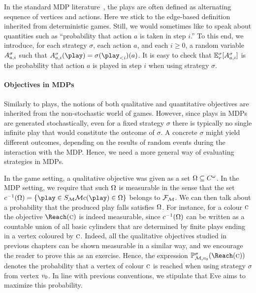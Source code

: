 
In the standard MDP literature~\cite{Puterman:2005}, the plays are often defined as alternating sequence of vertices and actions. Here we stick to the edge-based definition inherited from deterministic games. Still, we would sometimes like to speak about quantities such as ``probability that action $a$ is taken in step $i$.'' To this end, we introduce, for each strategy $\sigma$, each action $a$,  and each $i\geq 0$,  a random variable $A^{\sigma}_{a,i}$ such that $\actevent{\sigma}{a}{i}(\play)=\sigma(\play_{< i})(a)$. It is easy to check that  $\mathbb{E}^\sigma_v[A^{\sigma}_{a,i}]$ is the probability that action $a$ is played in step $i$ when using strategy $\sigma$.

\paragraph{Objectives in MDPs}

Similarly to plays, the notions of both qualitative and quantitative objectives 
are inherited from the non-stochastic world of games. However, since plays in 
MDPs are generated stochastically, even for a fixed strategy $\sigma$ there is 
typically no single infinite play that would constitute the outcome of 
$\sigma$. A concrete $\sigma$ might yield different outcomes, depending on the 
results of random events during the interaction with the MDP. Hence, we need a 
more general way of evaluating strategies in MDPs. 

In the game setting, a qualitative objective was given as a set $\Omega
\subseteq C^{\omega}$. In the MDP setting, we require that such 
$\Omega$ is measurable in the sense that the set $\colouring^{-1}(\objective) = \{\play \in \sampleSpace_{\mdp} \mdp \colouring(\play) \in \objective \}$ belongs to $\mathcal{F}_{\mathcal{M}}$. We can then talk about a 
probability that the produced play falls satisfies $\Omega$. For instance, for a 
colour $\textsc{c}$ the objective $ \Reach(\genColour) $ is indeed measurable, since $ c^{-1}(\Omega) $ can be written as a countable union of all basic cylinders that are determined by finite plays ending in a vertex coloured by $ \textsc{c} $. Indeed, all the qualitative objectives studied in previous chapters can be shown measurable in a similar way, and we encourage the reader to prove this as an exercise.
Hence, the expression 
$\probm^{\sigma}_{\mdp,\vinit}(\Reach(\genColour))$ 
denotes the probability that a vertex of colour $\textsc{c}$ is reached when 
using 
strategy $\sigma$ from vertex $v_0$. 
In line with previous conventions, we 
stipulate that Eve aims to maximize this probability. 


